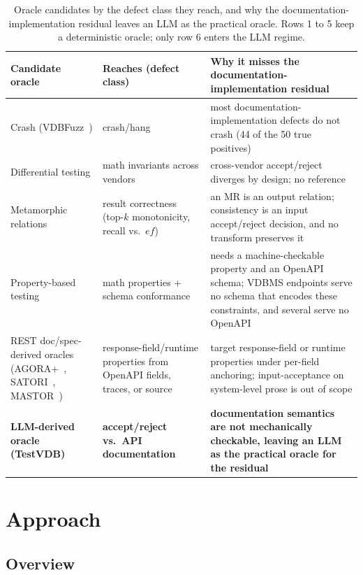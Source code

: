 \documentclass[sigconf]{acmart}
\begin{document}
\begin{table}[t]
\caption{Oracle candidates by the defect class they reach, and why the documentation-implementation residual leaves an LLM as the practical oracle. Rows 1 to 5 keep a deterministic oracle; only row 6 enters the LLM regime.}
\label{tab:exclusion}
\small
\begin{tabular}{@{}p{}p{}p{}@{}}
\toprule
Candidate oracle & Reaches (defect class) & Why it misses the documentation-implementation residual \\
\midrule
Crash (VDBFuzz~\cite{vdbfuzz26}) & crash/hang & most documentation-implementation defects do not crash (44 of the 50 true positives) \\
Differential testing & math invariants across vendors & cross-vendor accept/reject diverges by design; no reference~\cite{roadmap25} \\
Metamorphic relations~\cite{metmap24} & result correctness (top-$k$ monotonicity, recall vs.\ $ef$) & an MR is an output relation; consistency is an input accept/reject decision, and no transform preserves it \\
Property-based testing~\cite{claessen00,schemathesis,quickrest20} & math properties + schema conformance & needs a machine-checkable property and an OpenAPI schema; VDBMS endpoints serve no schema that encodes these constraints, and several serve no OpenAPI \\
REST doc/spec-derived oracles (AGORA+~\cite{agoraplus25}, SATORI~\cite{satori25}, MASTOR~\cite{mastor26}) & response-field/runtime properties from OpenAPI fields, traces, or source & target response-field or runtime properties under per-field anchoring; input-acceptance on system-level prose is out of scope \\
\textbf{LLM-derived oracle (TestVDB)} & \textbf{accept/reject vs.\ API documentation} & \textbf{documentation semantics are not mechanically checkable, leaving an LLM as the practical oracle for the residual} \\
\bottomrule
\end{tabular}
\end{table}

\section{Approach}
\label{sec:approach}

\subsection{Overview}
\label{subsec:overview}
\end{document}
